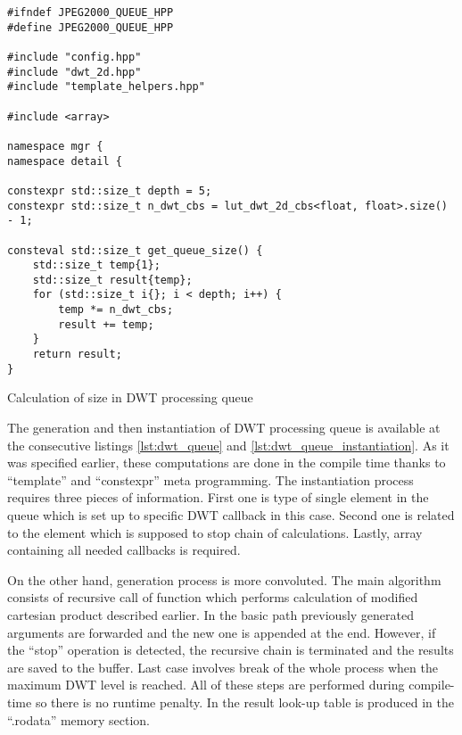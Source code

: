 \begin{listing}[!htb]
\begin{verbatim}
#ifndef JPEG2000_QUEUE_HPP
#define JPEG2000_QUEUE_HPP

#include "config.hpp"
#include "dwt_2d.hpp"
#include "template_helpers.hpp"

#include <array>

namespace mgr {
namespace detail {

constexpr std::size_t depth = 5;
constexpr std::size_t n_dwt_cbs = lut_dwt_2d_cbs<float, float>.size() - 1;

consteval std::size_t get_queue_size() {
    std::size_t temp{1};
    std::size_t result{temp};
    for (std::size_t i{}; i < depth; i++) {
        temp *= n_dwt_cbs;
        result += temp;
    }
    return result;
}
\end{verbatim}
\caption{Calculation of size in DWT processing queue}
\label{lst:dwt_queue_size}
\end{listing}

The generation and then instantiation of DWT processing queue is available at the consecutive listings
\ref{lst:dwt_queue} and \ref{lst:dwt_queue_instantiation}. As it was specified earlier, these
computations are done in the compile time thanks to ``template'' and ``constexpr'' meta programming.
The instantiation process requires three pieces of information. First one is type of single
element in the queue which is set up to specific DWT callback in this case. Second one is related
to the element which is supposed to stop chain of calculations. Lastly, array containing all
needed callbacks is required.

On the other hand, generation process is more convoluted. The main algorithm consists of recursive
call of function which performs calculation of modified cartesian product described earlier.
In the basic path previously generated arguments are forwarded and the new one is appended
at the end. However, if the ``stop'' operation is detected, the recursive chain is terminated
and the results are saved to the buffer. Last case involves break of the whole process when
the maximum DWT level is reached. All of these steps are performed during compile-time so
there is no runtime penalty. In the result look-up table is produced in the ``.rodata''
memory section.

